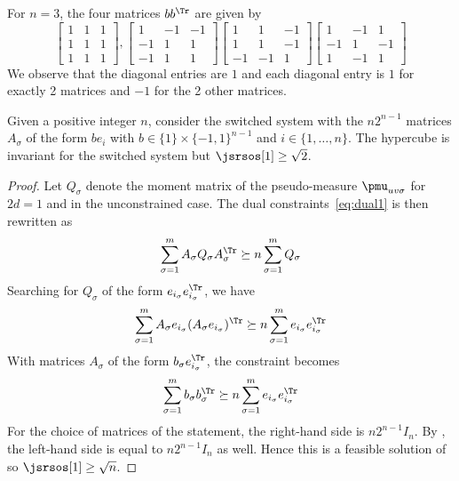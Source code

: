 \documentclass[11pt,twoside,a4paper,openright]{uclouvain-thesis}
\begin{document}
\begin{myexem}
  For $n = 3$, the four matrices $bb^\Tr$ are given by
  \[
    \begin{bmatrix}
      1 & 1 & 1\\
      1 & 1 & 1\\
      1 & 1 & 1
    \end{bmatrix},
    \begin{bmatrix}
       1 & -1 & -1\\
      -1 &  1 &  1\\
      -1 &  1 &  1
    \end{bmatrix}
    \begin{bmatrix}
       1 &  1 & -1\\
       1 &  1 & -1\\
      -1 & -1 &  1
    \end{bmatrix}
    \begin{bmatrix}
       1 & -1 &  1\\
      -1 &  1 & -1\\
       1 & -1 &  1
    \end{bmatrix}
  \]
  We observe that the diagonal entries are $1$ and each diagonal entry is $1$ for exactly 2
  matrices and $-1$ for the 2 other matrices.
\end{myexem}

\begin{mytheo}
  Given a positive integer $n$, consider the switched system with the $n2^{n-1}$ matrices $A_\sigma$
  of the form $be_i$ with $b \in \{1\} \times \{-1, 1\}^{n-1}$ and $i \in \{1, \ldots, n\}$.
  The hypercube is invariant for the switched system but $\jsrsos[1] \ge \sqrt{2}$.
  \begin{proof}
    Let $Q_\sigma$ denote the moment matrix of the pseudo-measure $\pmu_{uv\sigma}$ for $2d = 1$ and in the unconstrained case.
    The dual constraints~\eqref{eq:dual1} is then rewritten as
    \begin{equation}
      \label{eq:dualquadjsr}
      \sum_{\sigma = 1}^m A_\sigma Q_\sigma A_\sigma^\Tr \succeq n \sum_{\sigma = 1}^m Q_\sigma
    \end{equation}
    Searching for $Q_\sigma$ of the form $e_{i_\sigma} e_{i_\sigma}^\Tr$,
    we have
    \[
      \sum_{\sigma = 1}^m A_\sigma e_{i_\sigma} (A_\sigma e_{i_\sigma})^\Tr
      \succeq
      n \sum_{\sigma = 1}^m e_{i_\sigma} e_{i_\sigma}^\Tr
    \]
    With matrices $A_\sigma$ of the form $b_\sigma e_{i_\sigma}^\Tr$,
    the constraint becomes
    \begin{equation}
      \label{eq:sumb}
      \sum_{\sigma = 1}^m b_\sigma b_\sigma^\Tr
      \succeq
      n \sum_{\sigma = 1}^m e_{i_\sigma} e_{i_\sigma}^\Tr
    \end{equation}
    For the choice of matrices of the statement,
    the right-hand side is $n 2^{n-1} I_n$.
    By , the left-hand side is equal to $n2^{n-1}I_n$ as well.
    Hence this is a feasible solution of 
    so $\jsrsos[1] \ge \sqrt{n}$.
  \end{proof}
\end{mytheo}
\end{document}
